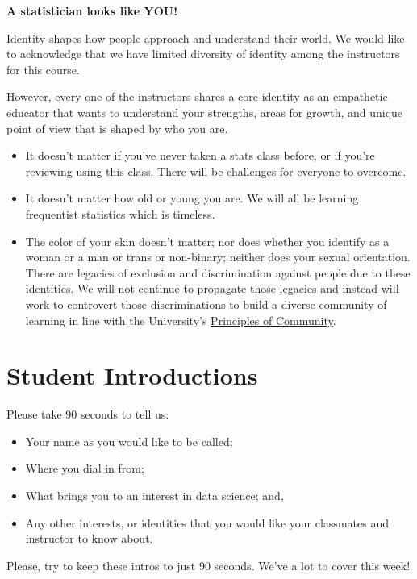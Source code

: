 \documentclass[
]{book}
\providecommand{\tightlist}{%
  \setlength{\itemsep}{0pt}\setlength{\parskip}{0pt}}
\theoremstyle{definition}
\theoremstyle{definition}
\theoremstyle{definition}
\theoremstyle{definition}
\theoremstyle{remark}
\begin{document}
\textbf{A statistician looks like YOU!}

Identity shapes how people approach and understand their world. We would like to acknowledge that we have limited diversity of identity among the instructors for this course.

However, every one of the instructors shares a core identity as an empathetic educator that wants to understand your strengths, areas for growth, and unique point of view that is shaped by who you are.

\begin{itemize}
\tightlist
\item
  It doesn't matter if you've never taken a stats class before, or if you're reviewing using this class. There will be challenges for everyone to overcome.
\item
  It doesn't matter how old or young you are. We will all be learning frequentist statistics which is timeless.
\item
  The color of your skin doesn't matter; nor does whether you identify as a woman or a man or trans or non-binary; neither does your sexual orientation. There are legacies of exclusion and discrimination against people due to these identities. We will not continue to propagate those legacies and instead will work to controvert those discriminations to build a diverse community of learning in line with the University's \href{https://diversity.berkeley.edu/principles-community}{Principles of Community}.
\end{itemize}

\hypertarget{student-introductions}{%
\section{Student Introductions}\label{student-introductions}}

Please take 90 seconds to tell us:

\begin{itemize}
\tightlist
\item
  Your name as you would like to be called;
\item
  Where you dial in from;
\item
  What brings you to an interest in data science; and,
\item
  Any other interests, or identities that you would like your classmates and instructor to know about.
\end{itemize}

Please, try to keep these intros to just 90 seconds. We've a lot to cover this week!
\end{document}
